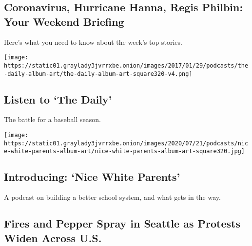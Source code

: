 \href{/2020/07/26/briefing/coronavirus-hurricane-hanna-regis-philbin.html}{}

\hypertarget{coronavirus-hurricane-hanna-regis-philbin-your-weekend-briefing}{%
\subsection{Coronavirus, Hurricane Hanna, Regis Philbin: Your Weekend
Briefing}\label{coronavirus-hurricane-hanna-regis-philbin-your-weekend-briefing}}

Here's what you need to know about the week's top stories.

\href{/2020/07/24/podcasts/the-daily/mlb-baseball-season-coronavirus.html}{}

\texttt{[image: https://static01.graylady3jvrrxbe.onion/images/2017/01/29/podcasts/the-daily-album-art/the-daily-album-art-square320-v4.png]}

\href{/2020/07/24/podcasts/the-daily/mlb-baseball-season-coronavirus.html}{}

\hypertarget{listen-to-the-daily}{%
\subsection{Listen to `The Daily'}\label{listen-to-the-daily}}

The battle for a baseball season.

\href{/2020/07/23/podcasts/nice-white-parents-serial.html}{}

\texttt{[image: https://static01.graylady3jvrrxbe.onion/images/2020/07/21/podcasts/nice-white-parents-album-art/nice-white-parents-album-art-square320.jpg]}

\href{/2020/07/23/podcasts/nice-white-parents-serial.html}{}

\hypertarget{introducing-nice-white-parents}{%
\subsection{Introducing: `Nice White
Parents'}\label{introducing-nice-white-parents}}

A podcast on building a better school system, and what gets in the way.

\href{/2020/07/25/us/protests-seattle-portland.html}{}

\hypertarget{fires-and-pepper-spray-in-seattle-as-protests-widen-across-us}{%
\subsection{Fires and Pepper Spray in Seattle as Protests Widen Across
U.S.}\label{fires-and-pepper-spray-in-seattle-as-protests-widen-across-us}}

